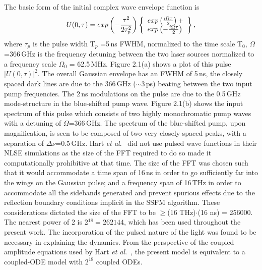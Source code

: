 The basic form of the initial complex wave envelope function is
\begin {equation}
U(0,\tau) = exp \left( - {\tau^2 \over 2\tau_p^2} \right)
\left\{
\begin{array}{l}
exp\left( {i\Omega\tau \over 2} \right) + \\
exp\left( - {i\Omega\tau \over 2} \right)
\end{array}
\right\} ,
\end{equation}
where $\tau_p$ is the pulse width T$_p$ =5\,ns FWHM, normalized to the time scale
T$_0$, $\Omega$=366\,GHz is the frequency detuning between the two laser
sources normalized to a frequency scale $\Omega_0$ = 62.5\,MHz.  Figure 2.1(a)
shows a plot of this pulse $|U(0,\tau)|^2$. The overall Gaussian envelope
has an FWHM of 5\,ns, the closely spaced dark lines are due to the 366\,GHz
($\sim$3\,ps) beating between the two input pump frequencies. The 2\,ns
modulations on the pulse are due to the 0.5\,GHz mode-structure in the
blue-shifted pump wave. Figure 2.1(b) shows the input spectrum of this pulse
which consists of two highly monochromatic pump waves with a detuning of
$\Omega$=366\,GHz. The spectrum of the blue-shifted pump, upon magnification,
is seen to be composed of two very closely spaced peaks, with a separation of
$\Delta\nu$=0.5\,GHz. Hart {\it et al}.\ \cite{hart1} did not use pulsed
wave functions in their NLSE simulations as the size of the FFT required to do
so made it computationally prohibitive at that time. The size of the FFT was
chosen such that it would accommodate a time span of 16\,ns in order to go
sufficiently far into the wings on the Gaussian pulse; and a frequency span of
16\,THz in order to accommodate all the sidebands generated and prevent
spurious effects due to the reflection boundary conditions implicit in the
SSFM algorithm. These considerations dictated the size of the FFT to be
$\geq$(16 THz)$\cdot$(16 ns) = 256000. The nearest power of 2 is
2$^{18} = 262144$, which has been used throughout the present work. The
incorporation of the pulsed nature of the light was found to be necessary in
explaining the dynamics. From the perspective of the coupled amplitude
equations used by Hart {\it et al}.\ \cite{hart1}, the present model is equivalent
to a coupled-ODE model with $2^{18}$ coupled ODEs.

